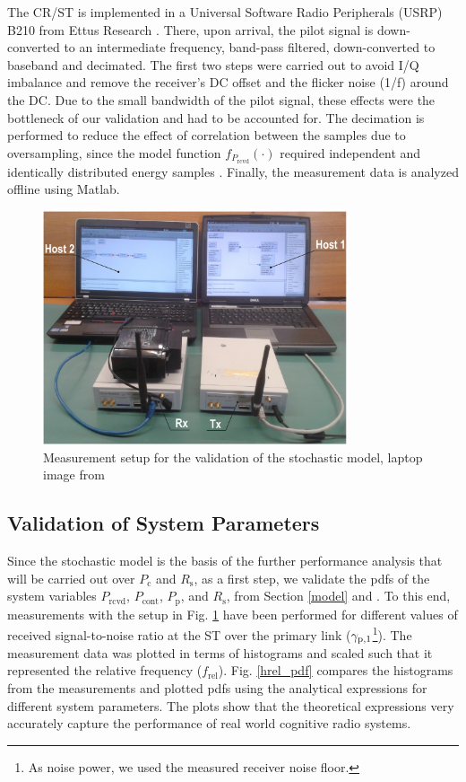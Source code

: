The CR/ST is implemented in a Universal Software Radio Peripherals (USRP) B210 from Ettus Research \cite{Ettus}. There, upon arrival, the pilot signal is down-converted to an intermediate frequency, band-pass filtered, down-converted to baseband and decimated. The first two steps were carried out to avoid I/Q imbalance and remove the receiver's DC offset and the flicker noise (1/f) around the DC. Due to the small bandwidth of the pilot signal, these effects were the bottleneck of our validation and had to be accounted for. The decimation is performed to reduce the effect of correlation between the samples due to oversampling, since the model function $f_{P_\textrm{rcvd}}(\cdot)$ required independent and identically distributed energy samples \cite{Kaushik15}. Finally, the measurement data is analyzed offline using Matlab.

\begin{figure}
	\centering
	\includegraphics[width=0.8\textwidth]{figures/setup}
	\caption{Measurement setup for the validation of the stochastic model, laptop image from \cite{Laptop}}
	\label{messaufbau}
\end{figure}


\subsection{Validation of System Parameters}

Since the stochastic model is the basis of the further performance analysis that will be carried out over $P_\textrm{c}$ and $R_\textrm{s}$, as a first step, we validate the pdfs of the system variables $P_\textrm{rcvd}$, $P_\textrm{cont}$, $P_\textrm{p}$, and $R_\textrm{s}$, from Section \ref{model} and \cite{Kaushik15}. To this end, measurements with the setup in Fig. \ref{messaufbau} have been performed for different values of received signal-to-noise ratio at the ST over the primary link (${\gamma}_{\text{p,1}}$\footnote{As noise power, we used the measured receiver noise floor.}). The measurement data was plotted in terms of histograms and scaled such that it represented the relative frequency ($f_\textrm{rel}$). Fig. \ref{hrel_pdf} compares the histograms from the measurements and plotted pdfs using the analytical expressions for different system parameters. The plots show that the theoretical expressions very accurately capture the performance of real world cognitive radio systems.

